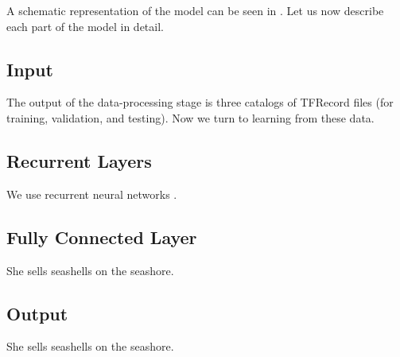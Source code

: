 
A schematic representation of the model can be seen in . Let us now
describe each part of the model in detail.

\subsection{Input}
The output of the data-processing stage is three catalogs of TFRecord files (for
training, validation, and testing). Now we turn to learning from these data.

\subsection{Recurrent Layers}
We use recurrent neural networks \cite{goodfellow2016}.

\subsection{Fully Connected Layer}
She sells seashells on the seashore.

\subsection{Output}
She sells seashells on the seashore.
